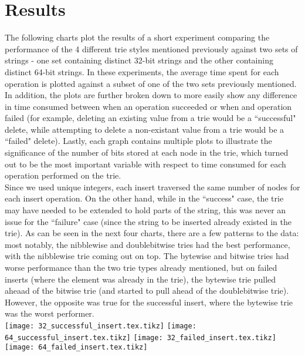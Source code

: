 \documentclass{llncs}
\begin{document}
\section{Results}
The following charts plot the results of a short experiment comparing the performance of the 4 different trie styles mentioned previously against two sets of strings - one set containing distinct 32-bit strings and the other containing distinct 64-bit strings. In these experiments, the average time spent for each operation is plotted against a subset of one of the two sets previously mentioned. In addition, the plots are further broken down to more easily show any difference in time consumed between when an operation succeeded or when and operation failed (for example, deleting an existing value from a trie would be a ``successful" delete, while attempting to delete a non-existant value from a trie would be a ``failed" delete). Lastly, each graph contains multiple plots to illustrate the significance of the number of bits stored at each node in the trie, which turned out to be the most important variable with respect to time consumed for each operation performed on the trie. \\

\newpage
Since we used unique integers, each insert traversed the same number of nodes for each insert operation. On the other hand, while in the ``success" case, the trie may have needed to be extended to hold parts of the string, this was never an issue for the ``failure" case (since the string to be inserted already existed in the trie). As can be seen in the next four charts, there are a few patterns to the data: most notably, the nibblewise and doublebitwise tries had the best performance, with the nibblewise trie coming out on top. The bytewise and bitwise tries had worse performance than the two trie types already mentioned, but on failed inserts (where the element was already in the trie), the bytewise trie pulled aheaad of the bitwise trie (and started to pull ahead of the doublebitwise trie). However, the opposite was true for the successful insert, where the bytewise trie was the worst performer.\\
\texttt{[image: 32\_successful\_insert.tex.tikz]}
\texttt{[image: 64\_successful\_insert.tex.tikz]}
\texttt{[image: 32\_failed\_insert.tex.tikz]}
\texttt{[image: 64\_failed\_insert.tex.tikz]}
\end{document}
